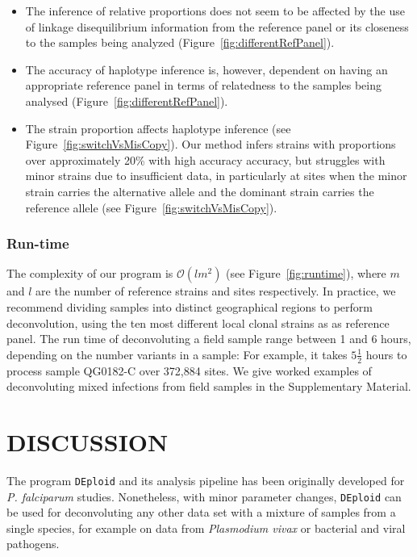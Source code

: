 \documentclass{nature}
\begin{document}
\begin{itemize}

\item The inference of relative proportions does not seem to be affected by the use of linkage disequilibrium information from the reference panel or its closeness to the samples being analyzed (Figure~\ref{fig:differentRefPanel}).

\item The accuracy of haplotype inference is, however, dependent on having an appropriate reference panel in terms of relatedness to the samples being analysed (Figure~\ref{fig:differentRefPanel}).

\item The strain proportion affects haplotype inference (see Figure~\ref{fig:switchVsMisCopy}). Our method infers strains with proportions over approximately 20\% with high accuracy  accuracy, but struggles with minor strains due to insufficient data, in particularly at sites when the minor strain carries the alternative allele and the dominant strain carries the reference allele (see Figure~\ref{fig:switchVsMisCopy}).

\end{itemize}




\subsubsection*{Run-time}

The complexity of our program is $\mathcal{O}(lm^2)$ (see Figure~\ref{fig:runtime}), where $m$ and $l$ are the number of reference strains and sites respectively. In practice, we recommend dividing samples into distinct geographical regions to perform deconvolution, using the ten most different local clonal strains as as reference panel. The run time of deconvoluting a field sample range between 1 and 6 hours, depending on the number variants in a sample: For example, it takes $5\frac{1}{2}$ hours to process sample {\textmd QG0182-C} over 372,884 sites.  We give worked examples of deconvoluting mixed infections from field samples in the Supplementary Material.



\section*{DISCUSSION}

The program \texttt{DEploid} and its analysis pipeline has been originally developed for {\it P. falciparum} studies. Nonetheless, with minor parameter changes, \texttt{DEploid} can be used for deconvoluting any other data set with a mixture of samples from a single species, for example on data from {\it Plasmodium vivax} \cite{Pearson2016} or bacterial and viral pathogens.
\end{document}
